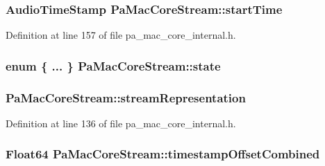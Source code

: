 \subsubsection[{\texorpdfstring{start\+Time}{startTime}}]{\setlength{\rightskip}{0pt plus 5cm}Audio\+Time\+Stamp Pa\+Mac\+Core\+Stream\+::start\+Time}\hypertarget{struct_pa_mac_core_stream_aa9eec45ab4d032a62a5edf9815aa95c5}{}\label{struct_pa_mac_core_stream_aa9eec45ab4d032a62a5edf9815aa95c5}


Definition at line 157 of file pa\+\_\+mac\+\_\+core\+\_\+internal.\+h.

\subsubsection[{\texorpdfstring{state}{state}}]{\setlength{\rightskip}{0pt plus 5cm}enum \{ ... \}   Pa\+Mac\+Core\+Stream\+::state}\hypertarget{struct_pa_mac_core_stream_a18df3b14e087124f9da12f49589a4c87}{}\label{struct_pa_mac_core_stream_a18df3b14e087124f9da12f49589a4c87}
\subsubsection[{\texorpdfstring{stream\+Representation}{streamRepresentation}}]{ Pa\+Mac\+Core\+Stream\+::stream\+Representation}\hypertarget{struct_pa_mac_core_stream_a37e7f3609f183162f0938ae24dd838f7}{}\label{struct_pa_mac_core_stream_a37e7f3609f183162f0938ae24dd838f7}


Definition at line 136 of file pa\+\_\+mac\+\_\+core\+\_\+internal.\+h.

\subsubsection[{\texorpdfstring{timestamp\+Offset\+Combined}{timestampOffsetCombined}}]{\setlength{\rightskip}{0pt plus 5cm}Float64 Pa\+Mac\+Core\+Stream\+::timestamp\+Offset\+Combined}\hypertarget{struct_pa_mac_core_stream_a169f40774042f35654987a0d5daa369d}{}\label{struct_pa_mac_core_stream_a169f40774042f35654987a0d5daa369d}



